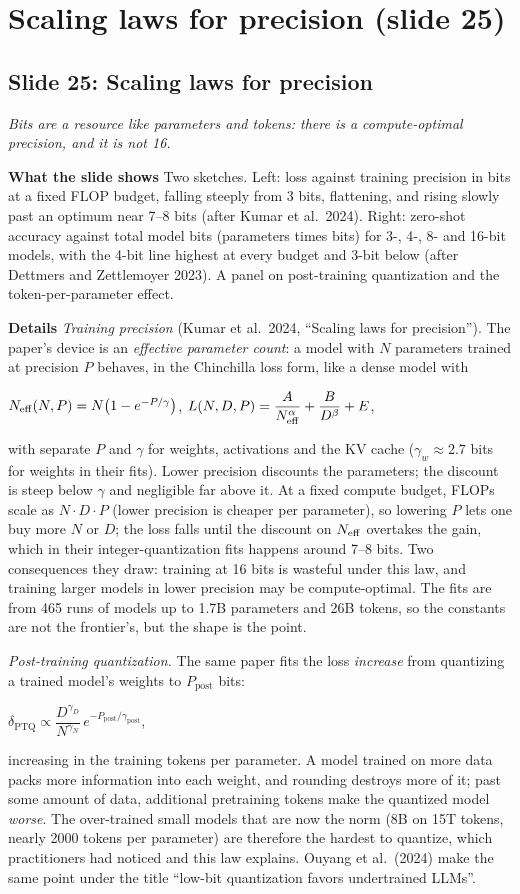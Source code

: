 \documentclass[11pt,letterpaper]{article}
\newcommand{\setstage}[1]{\colorlet{stagec}{#1}}
\newcommand{\slide}[3]{%
  \subsection[Slide #1: #2]{Slide #1: #2}%
  {\color{muted}\itshape #3\par}\medskip}
\newcommand{\para}[1]{\medskip\noindent\textbf{#1}\quad}
\newenvironment{formulas}{\begin{tcolorbox}[formulabox]}{\end{tcolorbox}}
\begin{document}
\clearpage
\setstage{trn}
\section{Scaling laws for precision (slide 25)}

\slide{25}{Scaling laws for precision}{Bits are a resource like parameters and tokens: there is a compute-optimal precision, and it is not 16.}

\para{What the slide shows} Two sketches. Left: loss against training precision in bits at a fixed FLOP budget, falling steeply from 3 bits, flattening, and rising slowly past an optimum near 7--8 bits (after Kumar et al.\ 2024). Right: zero-shot accuracy against total model bits (parameters times bits) for 3-, 4-, 8- and 16-bit models, with the 4-bit line highest at every budget and 3-bit below (after Dettmers and Zettlemoyer 2023). A panel on post-training quantization and the token-per-parameter effect.

\para{Details} \emph{Training precision} (Kumar et al.\ 2024, ``Scaling laws for precision''). The paper's device is an \emph{effective parameter count}: a model with $N$ parameters trained at precision $P$ behaves, in the Chinchilla loss form, like a dense model with
\begin{formulas}
$N_{\mathrm{eff}}(N,P)=N\big(1-e^{-P/\gamma}\big)$, \qquad
$L(N,D,P)=\dfrac{A}{N_{\mathrm{eff}}^{\alpha}}+\dfrac{B}{D^{\beta}}+E$,
\end{formulas}
with separate $P$ and $\gamma$ for weights, activations and the KV cache ($\gamma_w\approx2.7$ bits for weights in their fits). Lower precision discounts the parameters; the discount is steep below $\gamma$ and negligible far above it. At a fixed compute budget, FLOPs scale as $N\cdot D\cdot P$ (lower precision is cheaper per parameter), so lowering $P$ lets one buy more $N$ or $D$; the loss falls until the discount on $N_{\mathrm{eff}}$ overtakes the gain, which in their integer-quantization fits happens around 7--8 bits. Two consequences they draw: training at 16 bits is wasteful under this law, and training larger models in lower precision may be compute-optimal. The fits are from 465 runs of models up to 1.7B parameters and 26B tokens, so the constants are not the frontier's, but the shape is the point.

\emph{Post-training quantization.} The same paper fits the loss \emph{increase} from quantizing a trained model's weights to $P_{\text{post}}$ bits:
\begin{formulas}
$\delta_{\text{PTQ}}\propto\dfrac{D^{\gamma_D}}{N^{\gamma_N}}\,e^{-P_{\text{post}}/\gamma_{\text{post}}}$,
\end{formulas}
increasing in the training tokens per parameter. A model trained on more data packs more information into each weight, and rounding destroys more of it; past some amount of data, additional pretraining tokens make the quantized model \emph{worse}. The over-trained small models that are now the norm (8B on 15T tokens, nearly 2000 tokens per parameter) are therefore the hardest to quantize, which practitioners had noticed and this law explains. Ouyang et al.\ (2024) make the same point under the title ``low-bit quantization favors undertrained LLMs''.
\end{document}
